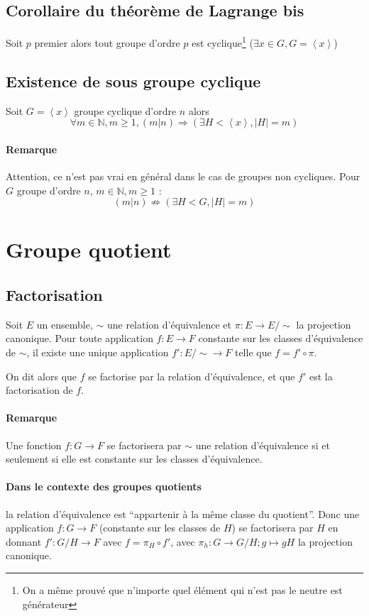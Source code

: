 \documentclass[a4paper,10pt]{report}
\newcommand{\grp}[1]{\left\langle #1 \right\rangle} %
\newcommand{\IN}{\mathbb{N}} %
\newcommand{\so}{\Rightarrow}
\newcommand{\mfootnote}[1]{\up{(}\footnote{#1}\up{)}}
\begin{document}
   \subsection{Corollaire du théorème de Lagrange bis}
    Soit $p$ premier alors tout groupe d'ordre $p$ est
    cyclique\mfootnote{On a même prouvé que n'importe quel élément qui n'est pas
    le neutre est générateur} ($\exists x \in G, G=\grp{x}$)
 
   \subsection{Existence de sous groupe cyclique}
    Soit $G=\grp{x}$ groupe cyclique d'ordre $n$ alors
    $$\forall m \in \IN, m \geq 1, \left( m \Big| n \right) \so (\exists H <
    \grp{x}, |H|=m)$$

    \paragraph{Remarque} Attention, ce n'est pas vrai en général dans le cas de
    groupes non cycliques. Pour $G$ groupe d'ordre $n$, $m \in \IN, m \geq 1$ :
    $$\left( m \Big| n \right) \not\so (\exists H < G, |H|=m)$$

  \section{Groupe quotient}
   \subsection{Factorisation}
    Soit $E$ un ensemble, $\sim$ une relation d'équivalence et $\pi : E \to E /
    \sim$ la projection canonique.
    Pour toute application $f : E \to F$ constante sur les classes
    d'équivalence de $\sim$, il existe une unique application $f' : E/\sim \to
    F$ telle que $f = f' \circ \pi$.

    On dit alors que $f$ se factorise par la relation d'équivalence, et que $f'$
    est la factorisation de $f$.

    \paragraph{Remarque}
     Une fonction $f:G \to F$ se factorisera par $\sim$ une relation
     d'équivalence si et seulement si elle est constante sur les classes
     d'équivalence.

    \paragraph{Dans le contexte des groupes quotients} la relation
     d'équivalence est ``appartenir à la même classe du quotient''. Donc une
     application $f: G \to F$ (constante sur les classes de $H$) se 
     factorisera par $H$ en donnant $f':G/H \to F$ avec $f = \pi_H \circ f'$,
     avec $\pi_h:G \to G/H; g \mapsto gH$ la projection canonique.
\end{document}
